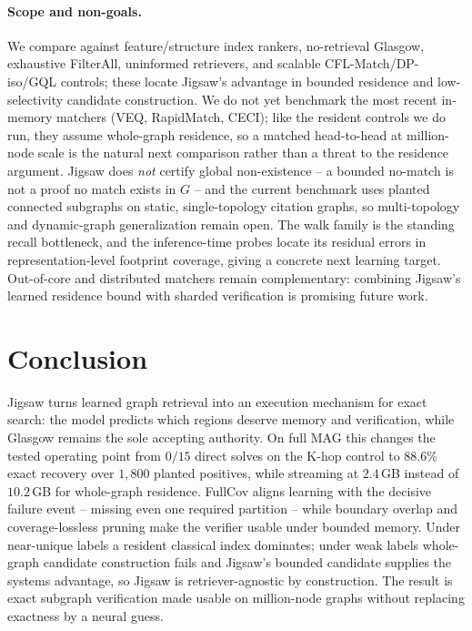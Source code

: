 \documentclass[sigconf, nonacm]{acmart}
\begin{document}
\paragraph{Scope and non-goals.}
We compare against feature/structure index rankers, no-retrieval Glasgow, exhaustive FilterAll, uninformed retrievers, and scalable CFL-Match/DP-iso/GQL controls; these locate Jigsaw's advantage in bounded residence and low-selectivity candidate construction. We do not yet benchmark the most recent in-memory matchers (VEQ, RapidMatch, CECI); like the resident controls we do run, they assume whole-graph residence, so a matched head-to-head at million-node scale is the natural next comparison rather than a threat to the residence argument. Jigsaw does \emph{not} certify global non-existence -- a bounded no-match is not a proof no match exists in $G$ -- and the current benchmark uses planted connected subgraphs on static, single-topology citation graphs, so multi-topology and dynamic-graph generalization remain open. The walk family is the standing recall bottleneck, and the inference-time probes locate its residual errors in representation-level footprint coverage, giving a concrete next learning target. Out-of-core and distributed matchers remain complementary: combining Jigsaw's learned residence bound with sharded verification is promising future work.

\section{Conclusion}
\label{sec:conclusion}

Jigsaw turns learned graph retrieval into an execution mechanism for exact search: the model predicts which regions deserve memory and verification, while Glasgow remains the sole accepting authority. On full MAG this changes the tested operating point from $0/15$ direct solves on the K-hop control to $88.6\%$ exact recovery over $1{,}800$ planted positives, while streaming at $2.4$\,GB instead of $10.2$\,GB for whole-graph residence. FullCov aligns learning with the decisive failure event -- missing even one required partition -- while boundary overlap and coverage-lossless pruning make the verifier usable under bounded memory. Under near-unique labels a resident classical index dominates; under weak labels whole-graph candidate construction fails and Jigsaw's bounded candidate supplies the systems advantage, so Jigsaw is retriever-agnostic by construction. The result is exact subgraph verification made usable on million-node graphs without replacing exactness by a neural guess.
\end{document}
